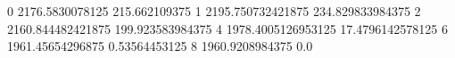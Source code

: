 0 2176.5830078125 215.662109375
1 2195.750732421875 234.829833984375
2 2160.844482421875 199.923583984375
4 1978.4005126953125 17.4796142578125
6 1961.45654296875 0.53564453125
8 1960.9208984375 0.0
